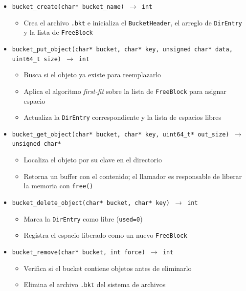 \documentclass[12pt, letterpaper]{article}
\begin{document}
\begin{itemize}
    \subsection*{Gestión de buckets}
    \item \texttt{bucket\_create(char* bucket\_name) $\to$ int}
        \begin{itemize}
            \item Crea el archivo \texttt{.bkt} e inicializa el 
                  \texttt{BucketHeader}, el arreglo de \texttt{DirEntry} 
                  y la lista de \texttt{FreeBlock}
        \end{itemize}
    \item \texttt{bucket\_put\_object(char* bucket, char* key, 
          unsigned char* data, uint64\_t size) $\to$ int}
        \begin{itemize}
            \item Busca si el objeto ya existe para reemplazarlo
            \item Aplica el algoritmo \textit{first-fit} sobre la lista 
                  de \texttt{FreeBlock} para asignar espacio
            \item Actualiza la \texttt{DirEntry} correspondiente y la 
                  lista de espacios libres
        \end{itemize}
    \item \texttt{bucket\_get\_object(char* bucket, char* key, 
          uint64\_t* out\_size) $\to$ unsigned char*}
        \begin{itemize}
            \item Localiza el objeto por su clave en el directorio
            \item Retorna un buffer con el contenido; el llamador es 
                  responsable de liberar la memoria con \texttt{free()}
        \end{itemize}
    \item \texttt{bucket\_delete\_object(char* bucket, char* key) $\to$ int}
        \begin{itemize}
            \item Marca la \texttt{DirEntry} como libre (\texttt{used=0})
            \item Registra el espacio liberado como un nuevo 
                  \texttt{FreeBlock}
        \end{itemize}
    \item \texttt{bucket\_remove(char* bucket, int force) $\to$ int}
        \begin{itemize}
            \item Verifica si el bucket contiene objetos antes de 
                  eliminarlo
            \item Elimina el archivo \texttt{.bkt} del sistema de archivos
        \end{itemize}


\end{itemize}
\end{document}
